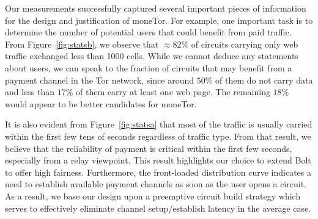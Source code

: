Our measurements successfully captured several important pieces of information for the design and justification of moneTor.
For example, one important task is to determine the number of potential users that could benefit from paid traffic.
From Figure~\ref{fig:statsb}, we observe that $\approx 82\%$ of circuits carrying only web traffic exchanged less than 1000 cells.
While we cannot deduce any statements about users, we can speak to the fraction of circuits that may benefit from a payment channel in the Tor network, since around $50\%$ of them do not carry data and less than $17\%$ of them carry at least one web page.
The remaining $18\%$ would appear to be better candidates for moneTor.

It is also evident from Figure~\ref{fig:statsa} that most of the traffic is usually carried within the first few tens of seconds regardless of traffic type.
From that result, we believe that the reliability of payment is critical within the first few seconds, especially from a relay viewpoint.
This result highlights our choice to extend Bolt to offer high fairness.
Furthermore, the front-loaded distribution curve indicates a need to establish available payment channels as soon as the user opens a circuit.
As a result, we base our design upon a preemptive circuit build strategy which serves to effectively eliminate channel setup/establish latency in the average case.
